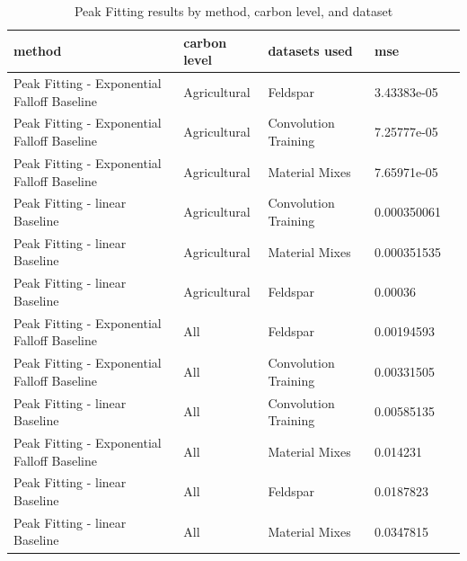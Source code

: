 \documentclass[review]{elsarticle}
\begin{document}
\begin{table}[H]
\centering
\caption{Peak Fitting results by method, carbon level, and dataset}
\label{tab:peak_fitting_results}
\begin{tabular}{@{}lllll@{}}
\toprule
method & carbon level & datasets used & mse \\
\midrule
Peak Fitting - Exponential Falloff Baseline & Agricultural & Feldspar & 3.43383e-05 \\
Peak Fitting - Exponential Falloff Baseline & Agricultural & Convolution Training & 7.25777e-05 \\
Peak Fitting - Exponential Falloff Baseline & Agricultural & Material Mixes & 7.65971e-05 \\
Peak Fitting - linear Baseline & Agricultural & Convolution Training & 0.000350061 \\
Peak Fitting - linear Baseline & Agricultural & Material Mixes & 0.000351535 \\
Peak Fitting - linear Baseline & Agricultural & Feldspar & 0.00036 \\
Peak Fitting - Exponential Falloff Baseline & All & Feldspar & 0.00194593 \\
Peak Fitting - Exponential Falloff Baseline & All & Convolution Training & 0.00331505 \\
Peak Fitting - linear Baseline & All & Convolution Training & 0.00585135 \\
Peak Fitting - Exponential Falloff Baseline & All & Material Mixes & 0.014231 \\
Peak Fitting - linear Baseline & All & Feldspar & 0.0187823 \\
Peak Fitting - linear Baseline & All & Material Mixes & 0.0347815 \\
\bottomrule
\end{tabular}
\end{table}
\end{document}
